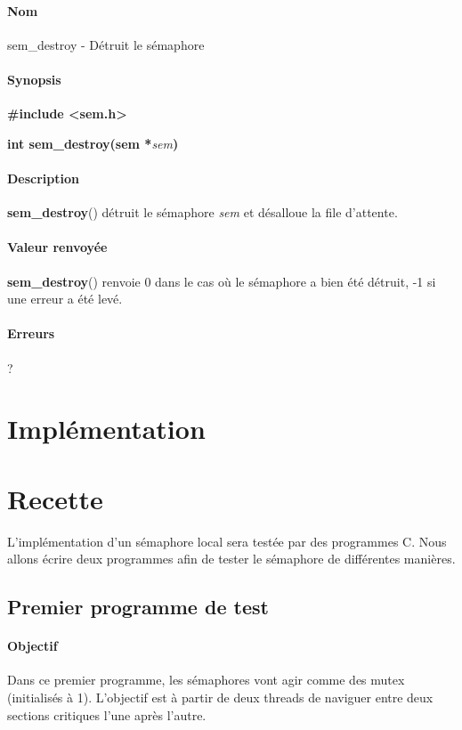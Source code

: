 \documentclass[12pt]{article}
\begin{document}
        \paragraph{Nom\\}
        sem\_destroy - Détruit le sémaphore
        \paragraph{Synopsis\\}
        \textbf{\#include <sem.h>}

        \textbf{int sem\_destroy(sem *}\textit{sem}\textbf{)}
        \paragraph{Description\\}
        \textbf{sem\_destroy}() détruit le sémaphore \textit{sem} et désalloue la file d'attente.

        \paragraph{Valeur renvoyée\\}
        \textbf{sem\_destroy}() renvoie 0 dans le cas où le sémaphore a bien été détruit, -1 si une erreur a été levé.
        \paragraph{Erreurs\\}
        ?
    \newpage

\section{Implémentation}
\newpage
\section{Recette}
L'implémentation d'un sémaphore local sera testée par des programmes C. Nous allons écrire deux programmes afin de tester le sémaphore de différentes manières.
\subsection{Premier programme de test}
  \paragraph{Objectif\\}
  Dans ce premier programme, les sémaphores vont agir comme des mutex (initialisés à 1). L'objectif est à partir de deux threads de naviguer entre deux sections critiques l'une après l'autre.
\end{document}
